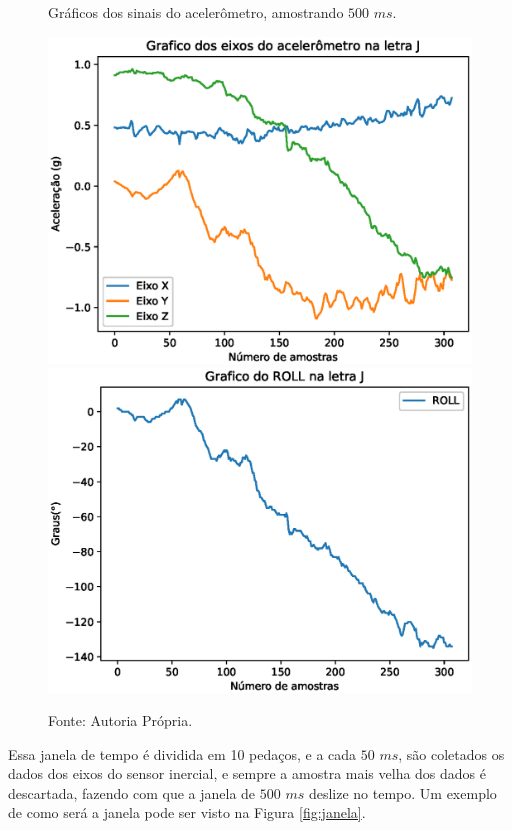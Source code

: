 \begin{figure}[H]
	\vspace{4mm}
	\centering
	\caption{Gráficos dos sinais do acelerômetro, amostrando $500$ $ms$.}
	\label{fig:espec_ACC}
	\includegraphics[scale=0.45]{imagens/espectro_acc.eps}
	\includegraphics[scale=0.45]{imagens/roll_acc.eps}	
	\caption*{Fonte: Autoria Própria.}
\end{figure}

Essa janela de tempo é dividida em 10 pedaços, e a cada $50$ $ms$, são coletados os dados dos eixos do sensor inercial, e sempre a amostra mais velha dos dados é descartada, fazendo com que a janela de $500$ $ms$ deslize no tempo. Um exemplo de como será a janela pode ser visto na Figura \ref{fig:janela}.

